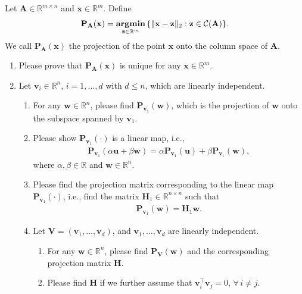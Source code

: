 \documentclass[11pt,letter,notitlepage]{article}
\DeclareMathOperator*{\argmin}{\bf argmin}
\newcommand{\proj}[2]{\textbf{P}_{#2} (#1)}
\begin{document}
	\begin{exercise}[Projection ]
		Let $\mathbf{A}\in\mathbb{R}^{m\times n}$ and $\mathbf{x} \in \mathbb{R}^m$. Define
		\begin{align*}
			\proj{\mathbf{x}}{\mathbf{A}} = \argmin_{\mathbf{z}\in\mathbb{R}^m}\,\{\|\mathbf{x}-\mathbf{z}\|_2: \mathbf{z}\in\mathcal{C}(\mathbf{A})\}.
		\end{align*}
		We call $\proj{\mathbf{x}}{\mathbf{A}}$ the projection of the point $\mathbf{x}$ onto the column space of $\mathbf{A}$.
		\begin{enumerate}
			\item Please prove that $\mathbf{P}_{\mathbf{A}}(\mathbf{x})$ is unique for any $\mathbf{x} \in \mathbb{R}^m$.
			\item Let $\mathbf{v}_i \in \mathbb{R}^n$, $i=1,\ldots,d$ with $d\leq n$, which are linearly independent.
			\begin{enumerate}
				\item For any $\mathbf{w}\in \mathbb{R}^n$, please find $\proj{\mathbf{w}}{\mathbf{v}_1}$, which is the projection of $\mathbf{w}$ onto the subspace spanned by $\mathbf{v}_1$.
				\item Please show $\proj{\cdot}{\mathbf{v}_1}$ is a linear map, i.e.,
				\begin{align*}
					\proj{\alpha\mathbf{u}+\beta\mathbf{w}}{\mathbf{v}_1}=\alpha\proj{\mathbf{u}}{\mathbf{v}_1} + \beta \proj{\mathbf{w}}{\mathbf{v}_1},
				\end{align*}
				where $\alpha,\beta\in\mathbb{R}$ and $\mathbf{w}\in\mathbb{R}^n$.
				\item Please find the projection matrix corresponding to the linear map $\proj{\cdot}{\mathbf{v}_1}$, i.e., find the matrix $\mathbf{H}_1\in\mathbb{R}^{n\times n}$ such that
				\begin{align*}
					\proj{\mathbf{w}}{\mathbf{v}_1}=\mathbf{H}_1\mathbf{w}.
				\end{align*}
				\item Let $\mathbf{V}=(\mathbf{v}_1,\ldots,\mathbf{v}_d)$, and $\mathbf{v}_1,\ldots,\mathbf{v}_d$ are linearly independent.
				\begin{enumerate}
					\item For any $\mathbf{w}\in \mathbb{R}^n$, please find $\proj{\mathbf{w}}{\mathbf{V}}$ and the corresponding projection matrix $\mathbf{H}$.
					\item Please find $\mathbf{H}$ if we further assume that $\mathbf{v}_i^{\top}\mathbf{v}_j=0$, $\forall\,i\neq j$.
				\end{enumerate}
			\end{enumerate}
			

\end{enumerate}
\end{exercise}
\end{document}
